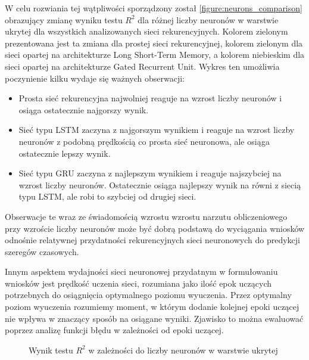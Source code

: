 \documentclass[10pt,a4paper]{article}
\begin{document}
W celu rozwiania tej wątpliwości sporządzony został \autoref{figure:neurons_comparison} obrazujący zmianę wyniku testu $R^2$ dla różnej liczby neuronów w warstwie ukrytej dla wszystkich analizowanych sieci rekurencyjnych. Kolorem zielonym prezentowana jest ta zmiana dla prostej sieci rekurencyjnej, kolorem zielonym dla sieci opartej na architekturze Long Short-Term Memory, a kolorem niebieskim dla sieci opartej na architekturze Gated Recurrent Unit. Wykres ten umożliwia poczynienie kilku wydaje się ważnych obserwacji:
\begin{itemize}
	\item Prosta sieć rekurencyjna najwolniej reaguje na wzrost liczby neuronów i osiąga ostatecznie najgorszy wynik.
	\item Sieć typu LSTM zaczyna z najgorszym wynikiem i reaguje na wzrost liczby neuronów z podobną prędkością co prosta sieć neuronowa, ale osiąga ostatecznie lepszy wynik.
	\item Sieć typu GRU zaczyna z najlepszym wynikiem i reaguje najszybciej na wzrost liczby neuronów. Ostatecznie osiąga najlepszy wynik na równi z siecią typu LSTM, ale robi to szybciej od drugiej sieci. 
\end{itemize}
Obserwacje te wraz ze świadomością wzrostu wzrostu narzutu obliczeniowego przy wzroście liczby neuronów może być dobrą podstawą do wyciągania wniosków odnośnie relatywnej przydatności rekurencyjnych sieci neuronowych do predykcji szeregów czasowych.

Innym aspektem wydajności sieci neuronowej przydatnym w formułowaniu wniosków jest prędkość uczenia sieci, rozumiana jako ilość epok uczących potrzebnych do osiągnięcia optymalnego poziomu wyuczenia. Przez optymalny poziom wyuczenia rozumiemy moment, w którym dodanie kolejnej epoki uczącej nie wpływa w znaczący sposób na osiągane wyniki. Zjawisko to można ewaluować poprzez analizę funkcji błędu w zależności od epoki uczącej. 

\begin{figure}[!ht]
	\centering
	\caption{Wynik testu $R^2$ w zależności do liczby neuronów w warstwie ukrytej}
	\label{figure:loss_history}
\end{figure}
\FloatBarrier
\end{document}
